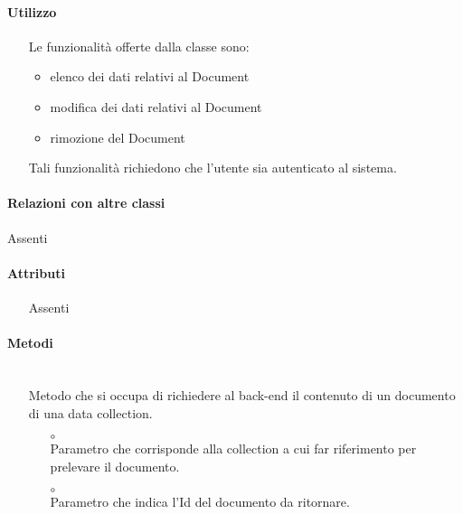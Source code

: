 \paragraph*{Utilizzo}
\begin{itemize}
\item[] Le funzionalità offerte dalla classe sono: 
\begin{itemize} 
\item elenco dei dati relativi al Document 
\item modifica dei dati relativi al Document
\item rimozione del Document 
\end{itemize} 
Tali funzionalità richiedono che l'utente sia autenticato al sistema.
\end{itemize}

\paragraph*{Relazioni con altre classi}
Assenti

\paragraph*{Attributi}
\begin{itemize}
\item[] Assenti
\end{itemize}

\paragraph*{Metodi}
\begin{itemize}
\item[]  \\ Metodo che si occupa di richiedere al back-end il contenuto di un documento di una data collection.
\begin{itemize}\addtolength{\itemsep}{-0.5\baselineskip}
\item[$\circ$]  \\ Parametro che corrisponde alla collection a cui far riferimento per prelevare il documento.
\item[$\circ$]  \\ Parametro che indica l'Id del documento da ritornare.
\end{itemize}
\end{itemize}

